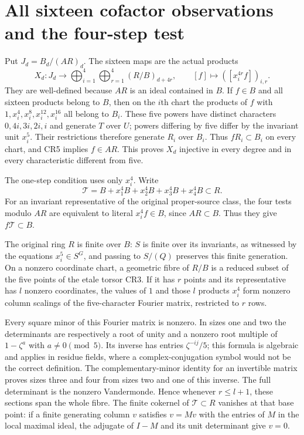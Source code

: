 \documentclass[11pt]{article}
\begin{document}
\section{All sixteen cofactor observations and the four-step test}
Put $J_d=B_d/(AR)_d$.  The sixteen maps are the actual products
\[
 X_d:J_d\longrightarrow\bigoplus_{i=1}^4\bigoplus_{r=1}^4
                          (R/B)_{d+4r},
 \qquad [f]\longmapsto([x_i^{4r}f])_{i,r}.                       \tag{CR6}
\]
They are well-defined because $AR$ is an ideal contained in $B$.
If $f\in B$ and all sixteen products belong to $B$, then on the
$i$th chart the products of $f$ with
$1,x_i^4,x_i^8,x_i^{12},x_i^{16}$ all belong to $B_i$.
These five powers have distinct characters $0,4i,3i,2i,i$ and
generate $T$ over $U$; powers differing by five differ by the
invariant unit $x_i^5$.  Their restrictions therefore generate
$R_i$ over $B_i$.  Thus $fR_i\subset B_i$ on every chart, and
CR5 implies $f\in AR$.  This proves $X_d$ injective in every
degree and in every characteristic different from five.

The one-step condition uses only $x_i^4$.  Write
\[
 \mathcal T=B+x_1^4B+x_2^4B+x_3^4B+x_4^4B\subset R.            \tag{CR7}
\]
For an invariant representative of the original proper-source
class, the four tests modulo $AR$ are equivalent to literal
$x_i^4f\in B$, since $AR\subset B$.  Thus they give
$f\mathcal T\subset B$.

The original ring $R$ is finite over $B$: $S$ is finite over its
invariants, as witnessed by the equations $x_i^5\in S^G$, and
passing to $S/(Q)$ preserves this finite generation.  On a nonzero
coordinate chart, a geometric fibre of $R/B$ is a reduced subset
of the five points of the etale torsor CR3.  If it has $r$ points
and its representative has $l$ nonzero coordinates, the values of
$1$ and those $l$ products $x_i^4$ form nonzero column scalings
of the five-character Fourier matrix, restricted to $r$ rows.

Every square minor of this Fourier matrix is nonzero.  In sizes
one and two the determinants are respectively a root of unity
and a nonzero root multiple of $1-\zeta^a$ with $a\ne0\pmod5$.
Its inverse has entries $\zeta^{-ij}/5$; this formula is algebraic
and applies in residue fields, where a complex-conjugation symbol
would not be the correct definition.  The complementary-minor
identity for an invertible matrix proves sizes three and four
from sizes two and one of this inverse.  The full determinant
is the nonzero Vandermonde.  Hence whenever $r\le l+1$, these
sections span the whole fibre.  The finite cokernel of
$\mathcal T\subset R$ vanishes at that base point: if a finite
generating column $v$ satisfies $v=Mv$ with the entries of $M$
in the local maximal ideal, the adjugate of $I-M$ and its unit
determinant give $v=0$.
\end{document}
